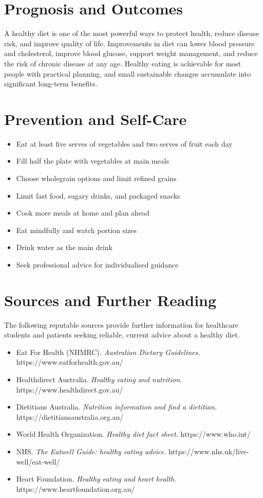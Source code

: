 \section*{Prognosis and Outcomes}
A healthy diet is one of the most powerful ways to protect health, reduce disease risk, and improve quality of life. Improvements in diet can lower blood pressure and cholesterol, improve blood glucose, support weight management, and reduce the risk of chronic disease at any age. Healthy eating is achievable for most people with practical planning, and small sustainable changes accumulate into significant long-term benefits.

\section*{Prevention and Self-Care}
\begin{itemize}
    \item Eat at least five serves of vegetables and two serves of fruit each day
    \item Fill half the plate with vegetables at main meals
    \item Choose wholegrain options and limit refined grains
    \item Limit fast food, sugary drinks, and packaged snacks
    \item Cook more meals at home and plan ahead
    \item Eat mindfully and watch portion sizes
    \item Drink water as the main drink
    \item Seek professional advice for individualised guidance
\end{itemize}

\section*{Sources and Further Reading}
The following reputable sources provide further information for healthcare students and patients seeking reliable, current advice about a healthy diet.

\begin{itemize}
    \item Eat For Health (NHMRC). \textit{Australian Dietary Guidelines.} https://www.eatforhealth.gov.au/
    \item Healthdirect Australia. \textit{Healthy eating and nutrition.} https://www.healthdirect.gov.au/
    \item Dietitians Australia. \textit{Nutrition information and find a dietitian.} https://dietitiansaustralia.org.au/
    \item World Health Organization. \textit{Healthy diet fact sheet.} https://www.who.int/
    \item NHS. \textit{The Eatwell Guide: healthy eating advice.} https://www.nhs.uk/live-well/eat-well/
    \item Heart Foundation. \textit{Healthy eating and heart health.} https://www.heartfoundation.org.au/
\end{itemize}
